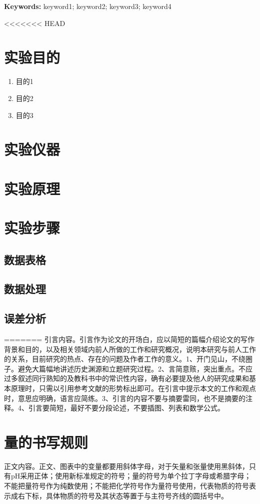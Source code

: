 \documentclass{whureport}
\begin{document}
\textbf{Keywords: }keyword1; keyword2; keyword3; keyword4

\begin{multicols}{2}
<<<<<<< HEAD
	\section{实验目的}
	\begin{enumerate}
		\item 目的1
		\item 目的2
		\item 目的3
	\end{enumerate}
	\section{实验仪器}
	\section{实验原理}
	\section{实验步骤}
	\subsection{数据表格}
	\subsection{数据处理}
	\subsection{误差分析}
=======
	引言内容。引言作为论文的开场白，应以简短的篇幅介绍论文的写作背景和目的，以及相关领域内前人所做的工作和研究概况，说明本研究与前人工作的关系，目前研究的热点、存在的问题及作者工作的意义。1、开门见山，不绕圈子。避免大篇幅地讲述历史渊源和立题研究过程。2、言简意赅，突出重点。不应过多叙述同行熟知的及教科书中的常识性内容，确有必要提及他人的研究成果和基本原理时，只需以引用参考文献的形势标出即可。在引言中提示本文的工作和观点时，意思应明确，语言应简练。3、引言的内容不要与摘要雷同，也不是摘要的注释。4、引言要简短，最好不要分段论述，不要插图、列表和数学公式。
	\section{量的书写规则}
	正文内容。正文、图表中的变量都要用斜体字母，对于矢量和张量使用黑斜体，只有pH采用正体；使用新标准规定的符号；量的符号为单个拉丁字母或希腊字母；不能把量符号作为纯数使用；不能把化学符号作为量符号使用，代表物质的符号表示成右下标，具体物质的符号及其状态等置于与主符号齐线的圆括号中\cite{snowflakes}。
	

\end{multicols}
\end{document}
